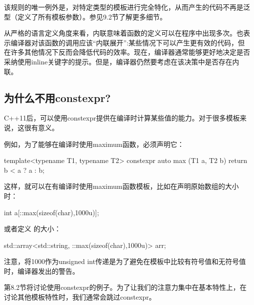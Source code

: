 该规则的唯一例外是，对特定类型的模板进行完全特化，从而产生的代码不再是泛型（定义了所有模板参数）。参见9.2节了解更多细节。
 
从严格的语言定义角度来看，内联意味着函数的定义可以在程序中出现多次。也表示编译器对该函数的调用应该“内联展开”:某些情况下可以产生更有效的代码，但在许多其他情况下反而会降低代码的效率。现在，编译器通常能够更好地决定是否采纳使用inline关键字的提示。但是，编译器仍然要考虑在该决策中是否存在内联。

\subsection{为什么不用constexpr?}

C++11后，可以使用constexpr提供在编译时计算某些值的能力。对于很多模板来说，这很有意义。

例如，为了能够在编译时使用maximum函数，必须声明它：

\begin{cpp}
template<typename T1, typename T2>
constexpr auto max (T1 a, T2 b) {
	return b < a ? a : b;
}
\end{cpp}

这样，就可以在有编译时使用maximum函数模板，比如在声明原始数组的大小时：

\begin{cpp}
int a[::max(sizeof(char),1000u)];
\end{cpp}

或者定义  的大小：

\begin{cpp}
std::array<std::string, ::max(sizeof(char),1000u)> arr;
\end{cpp}

注意，将1000作为unsigned int传递是为了避免在模板中比较有符号值和无符号值时，编译器发出的警告。

第8.2节将讨论使用constexpr的例子。为了让我们的注意力集中在基本特性上，在讨论其他模板特性时，我们通常会跳过constexpr。












